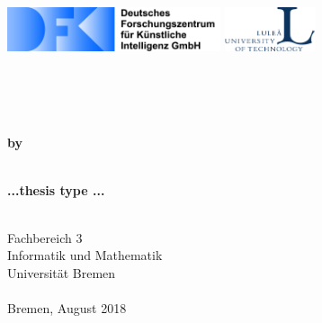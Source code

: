 

\begin{titlingpage}%
    \begin{flushleft}
        \includegraphics[height=13mm]{pictures/logo_dfki_text}\hfill %
        \includegraphics[height=13mm]{pictures/logo_uni}~\\%
    \end{flushleft}
    \vspace{3mm}
    \vspace{8mm}
    \textbf{\Large{}}\\

    \begin{center}
        \textbf{\Large{\myWorkingTitle}}\\
        \textbf{\Large{}}\\[2ex]
        \textbf{by}\\
        \textbf{\thesisAuthor}\\
        \vspace{3cm}

        \textbf{{...thesis type ...}}\\
        \textbf{}\\

        \vspace{4cm}

        Fachbereich 3\\
        Informatik und Mathematik\\
        Universität Bremen\\
        \textbf{}\\
        \vspace{1.6cm}
        {Bremen, August 2018 }


    \end{center}

\end{titlingpage}%
